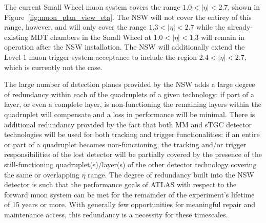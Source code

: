 The current Small Wheel muon system covers the range $1.0 < \lvert \eta \rvert < 2.7$, shown
in Figure~\ref{fig:muon_plan_view_eta}.
The NSW will not cover the entirey of this range, however, and will only cover the
range $1.3 < \lvert \eta \rvert < 2.7$ while the already-existing MDT chambers in the Small Wheel at $1.0 < \lvert \eta  \rvert < 1.3$
will remain in operation after the NSW installation.
The NSW will additionally extend the Level-1 muon trigger system acceptance to include
the region $2.4 < \lvert \eta \rvert < 2.7$, which is currently not the case.

The large number of detection planes provided by the NSW adds a large degree of redundancy
within each of the quadruplets of a given technology: if part of a layer, or even a complete layer,
is non-functioning the remaining layers within the quadruplet will compensate and a loss in performance
will be minimal.
There is additional redundancy provided by the fact that both MM and sTGC detector technologies
will be used for both tracking and trigger functionalities: if an entire or part of a quadruplet
becomes non-functioning, the tracking and/or trigger responsibilities of the lost detector
will be partially covered by the presence of the still-functioning quadruplet(s)/layer(s) of the other
detector technology covering the same or overlapping
$\eta$ range.
The degree of redundancy built into the NSW detector is such that the performance goals
of ATLAS with respect to the forward muon system can be met for the remainder of the experiment's
lifetime of 15 years or more.
With generally few opportunities for meaningful repair and maintenance access, this redundancy is
a necessity for these timescales.

